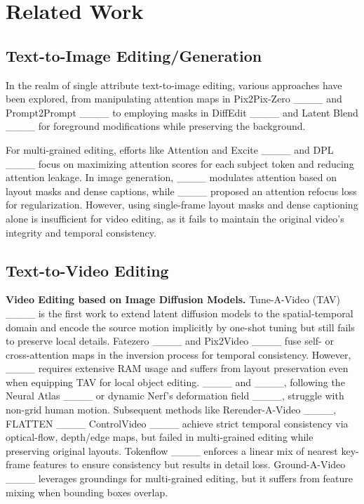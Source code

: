 \section{Related Work}
\subsection{Text-to-Image Editing/Generation}

In the realm of single attribute text-to-image editing, various approaches have been explored, from manipulating attention maps in Pix2Pix-Zero ____ and Prompt2Prompt ____ to employing masks in DiffEdit ____ and Latent Blend ____ for foreground modifications while preserving the background. 

For multi-grained editing, efforts like Attention and Excite ____ and DPL ____ focus on maximizing attention scores for each subject token and reducing attention leakage. In image generation, ____ modulates attention based on layout masks and dense captions, while ____ proposed an attention refocus loss for regularization. However, using single-frame layout masks and dense captioning alone is insufficient for video editing, as it fails to maintain the original video’s integrity and temporal consistency.

\subsection{Text-to-Video Editing}
\textbf{Video Editing based on Image Diffusion Models.}
Tune-A-Video (TAV) ____ is the first work to extend latent diffusion models to the spatial-temporal domain and encode the source motion implicitly by one-shot tuning but still fails to preserve local details. Fatezero ____ and Pix2Video ____ fuse self- or cross-attention maps in the inversion process for temporal consistency. 
However, ____ requires extensive RAM usage and suffers from layout preservation even when equipping TAV for local object editing. 
____ and ____, following the Neural Atlas ____ or dynamic Nerf's deformation field ____, struggle with non-grid human motion. 
Subsequent methods like Rerender-A-Video ____, FLATTEN ____ ControlVideo ____ achieve strict temporal consistency via optical-flow, depth/edge maps, but failed in multi-grained editing while preserving original layouts. Tokenflow ____ enforces a linear mix of nearest key-frame features to ensure consistency but results in detail loss. Ground-A-Video ____ leverages groundings for multi-grained editing, but it suffers from feature mixing when bounding boxes overlap.

